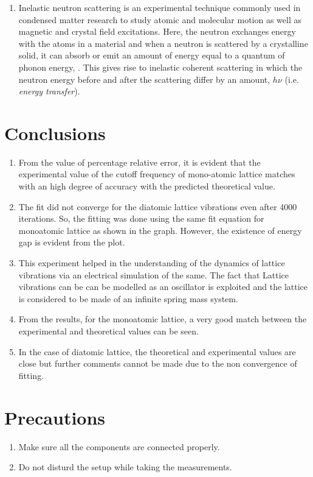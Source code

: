 \documentclass[%
 aip,
 amsmath,amssymb,
 reprint, floatfix%
]{revtex4-1}
\begin{document}
\begin{enumerate}
        \item Inelastic neutron scattering is an experimental technique commonly used in condensed matter research to study atomic and molecular motion as well as magnetic and crystal field excitations. Here, the neutron exchanges energy with the atoms in a material and when a neutron is scattered by a crystalline solid, it can absorb or emit an amount of energy equal to a quantum of phonon energy, . This gives rise to inelastic coherent scattering in which the neutron energy before and after the scattering differ by an amount, $h \nu$ (i.e. \textit{energy transfer}).
    \end{enumerate}

\section{Conclusions}
    \begin{enumerate}
        \item From the value of percentage relative error, it is evident that the experimental value of the cutoff frequency of mono-atomic lattice matches with an high degree of accuracy with the predicted theoretical value.
        \item The fit did not converge for the diatomic lattice vibrations even after 4000 iterations. So, the fitting was done using the same fit equation for monoatomic lattice as shown in the graph. However, the existence of energy gap is evident from the plot.
        \item This experiment helped in the understanding of the dynamics of lattice vibrations via an electrical simulation of the same. The fact that Lattice vibrations can be can be modelled as an oscillator is exploited and the lattice is considered to be made of an infinite spring mass system.
        \item From the results, for the monoatomic lattice, a very good match between the experimental and theoretical values can be seen.
        \item In the case of diatomic lattice, the theoretical and experimental values are close but further comments cannot be made due to the non convergence of fitting.
    \end{enumerate}
    
\section{Precautions}
    \begin{enumerate}
        \item Make sure all the components are connected properly.
        \item Do not disturd the setup while taking the measurements.
    \end{enumerate}
\end{document}
